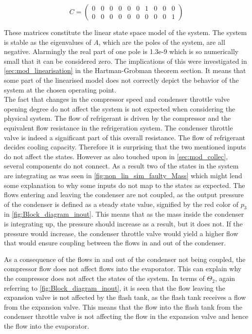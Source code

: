 \begin{equation}  \label{eq:C_full}
	C = \left(\begin{array}{ccccccccccc}
		0 & 0 & 0 & 0 & 0 & 0 & 1 & 0 & 0 & 0 \\
		0 & 0 & 0 & 0 & 0 & 0 & 0 & 0 & 0 & 1
	\end{array}\right)
\end{equation}

These matrices constitute the linear state space model of the system. The system is stable as the eigenvalues of $A$, which are the poles of the system, are all negative. Alarmingly the real part of one pole is 1.3e-9 which is so numerically small that it can be considered zero. The implications of this were investigated in \cref{sec:mod_linearisation} in the Hartman-Grobman theorem section. It means that some part of the linearised model does not correctly depict the behavior of the system at the chosen operating point. \\

The fact that changes in the compressor speed and condenser throttle valve opening degree do not affect the system is not expected when considering the physical system. The flow of refrigerant is driven by the compressor and the equivalent flow resistance in the refrigeration system. The condenser throttle valve is indeed a significant part of this overall resistance. The flow of refrigerant decides cooling capacity. Therefore it is surprising that the two mentioned inputs do not affect the states. However as also touched upon in \cref{sec:mod_collec}, several components do not connect. As a result two of the states in the system are integrating as was seen in \cref{fig:non_lin_sim_faulty_Mass} which might lend some explanation to why some inputs do not map to the states as expected. The flows entering and leaving the condenser are not coupled, as the output pressure of the condenser is defined as a steady state value, signified by the red color of $ p_3 $ in \cref{fig:Block_diagram_inout}. This means that as the mass inside the condenser is integrating up, the pressure should increase as a result, but it does not. If the pressure would increase, the condenser throttle valve would yield a higher flow that would ensure coupling between the flows in and out of the condenser.

As a consequence of the flows in and out of the condenser not being coupled, the compressor flow does not affect flows into the evaporator. This can explain why the compressor does not affect the states of the system. In terms of $ \Theta_2 $, again referring to \cref{fig:Block_diagram_inout}, it is seen that the flow leaving the expansion valve is not affected by the flash tank, as the flash tank receives a flow from the expansion valve. This means that the flow into the flash tank from the condenser throttle valve is not affecting the flow in the expansion valve and hence the flow into the evaporator.

